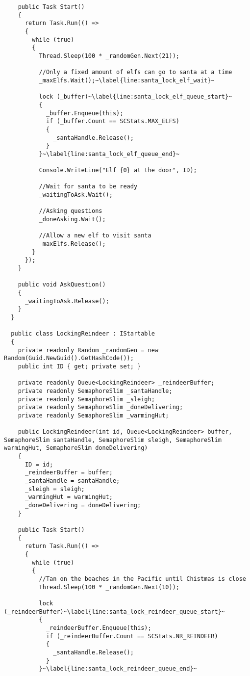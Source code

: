 \begin{lstlisting}
    public Task Start()
    {
      return Task.Run(() =>
      {
        while (true)
        {
          Thread.Sleep(100 * _randomGen.Next(21));

          //Only a fixed amount of elfs can go to santa at a time
          _maxElfs.Wait();~\label{line:santa_lock_elf_wait}~

          lock (_buffer)~\label{line:santa_lock_elf_queue_start}~
          {
            _buffer.Enqueue(this);
            if (_buffer.Count == SCStats.MAX_ELFS)
            {
              _santaHandle.Release();
            }
          }~\label{line:santa_lock_elf_queue_end}~

          Console.WriteLine("Elf {0} at the door", ID);

          //Wait for santa to be ready
          _waitingToAsk.Wait();

          //Asking questions
          _doneAsking.Wait();

          //Allow a new elf to visit santa
          _maxElfs.Release();
        }
      });
    }

    public void AskQuestion()
    {
      _waitingToAsk.Release();
    }
  }
  
  public class LockingReindeer : IStartable
  {
    private readonly Random _randomGen = new Random(Guid.NewGuid().GetHashCode());
    public int ID { get; private set; }

    private readonly Queue<LockingReindeer> _reindeerBuffer;
    private readonly SemaphoreSlim _santaHandle;
    private readonly SemaphoreSlim _sleigh;
    private readonly SemaphoreSlim _doneDelivering;
    private readonly SemaphoreSlim _warmingHut;

    public LockingReindeer(int id, Queue<LockingReindeer> buffer, SemaphoreSlim santaHandle, SemaphoreSlim sleigh, SemaphoreSlim warmingHut, SemaphoreSlim doneDelivering)
    {
      ID = id;
      _reindeerBuffer = buffer;
      _santaHandle = santaHandle;
      _sleigh = sleigh;
      _warmingHut = warmingHut;
      _doneDelivering = doneDelivering;
    }

    public Task Start()
    {     
      return Task.Run(() =>
      {
        while (true)
        {
          //Tan on the beaches in the Pacific until Chistmas is close
          Thread.Sleep(100 * _randomGen.Next(10));

          lock (_reindeerBuffer)~\label{line:santa_lock_reindeer_queue_start}~
          {
            _reindeerBuffer.Enqueue(this);
            if (_reindeerBuffer.Count == SCStats.NR_REINDEER)
            {
              _santaHandle.Release();
            }
          }~\label{line:santa_lock_reindeer_queue_end}~


\end{lstlisting}
